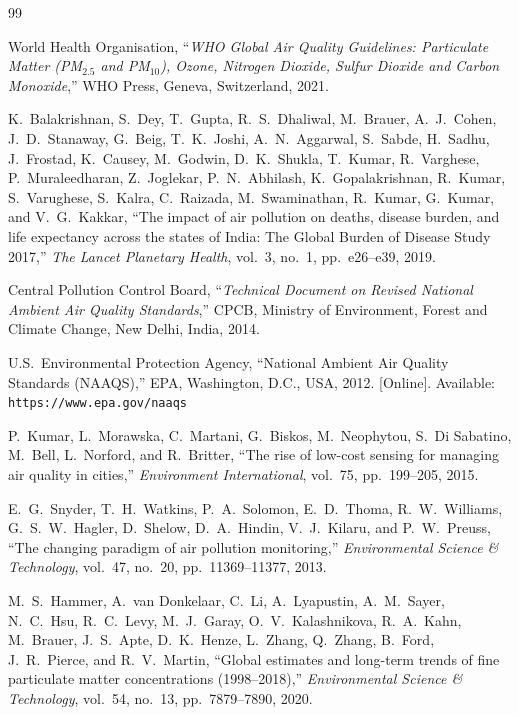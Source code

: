 \documentclass[conference]{IEEEtran}
\begin{document}
\begin{thebibliography}{99}

World Health Organisation,
``\emph{WHO Global Air Quality Guidelines: Particulate Matter (PM$_{2.5}$
and PM$_{10}$), Ozone, Nitrogen Dioxide, Sulfur Dioxide and Carbon
Monoxide},''
WHO Press, Geneva, Switzerland, 2021.

K.~Balakrishnan, S.~Dey, T.~Gupta, R.~S.~Dhaliwal, M.~Brauer,
A.~J.~Cohen, J.~D.~Stanaway, G.~Beig, T.~K.~Joshi, A.~N.~Aggarwal,
S.~Sabde, H.~Sadhu, J.~Frostad, K.~Causey, M.~Godwin, D.~K.~Shukla,
T.~Kumar, R.~Varghese, P.~Muraleedharan, Z.~Joglekar, P.~N.~Abhilash,
K.~Gopalakrishnan, R.~Kumar, S.~Varughese, S.~Kalra, C.~Raizada,
M.~Swaminathan, R.~Kumar, G.~Kumar, and V.~G.~Kakkar,
``The impact of air pollution on deaths, disease burden, and life expectancy
across the states of India: The Global Burden of Disease Study 2017,''
\emph{The Lancet Planetary Health}, vol.~3, no.~1, pp.~e26--e39, 2019.

Central Pollution Control Board,
``\emph{Technical Document on Revised National Ambient Air Quality
Standards},''
CPCB, Ministry of Environment, Forest and Climate Change,
New Delhi, India, 2014.

U.S.~Environmental Protection Agency,
``National Ambient Air Quality Standards (NAAQS),''
EPA, Washington, D.C., USA, 2012.
[Online]. Available: \texttt{https://www.epa.gov/naaqs}

P.~Kumar, L.~Morawska, C.~Martani, G.~Biskos, M.~Neophytou,
S.~Di Sabatino, M.~Bell, L.~Norford, and R.~Britter,
``The rise of low-cost sensing for managing air quality in cities,''
\emph{Environment International}, vol.~75, pp.~199--205, 2015.

E.~G.~Snyder, T.~H.~Watkins, P.~A.~Solomon, E.~D.~Thoma,
R.~W.~Williams, G.~S.~W.~Hagler, D.~Shelow, D.~A.~Hindin,
V.~J.~Kilaru, and P.~W.~Preuss,
``The changing paradigm of air pollution monitoring,''
\emph{Environmental Science \& Technology}, vol.~47, no.~20,
pp.~11369--11377, 2013.

M.~S.~Hammer, A.~van Donkelaar, C.~Li, A.~Lyapustin, A.~M.~Sayer,
N.~C.~Hsu, R.~C.~Levy, M.~J.~Garay, O.~V.~Kalashnikova, R.~A.~Kahn,
M.~Brauer, J.~S.~Apte, D.~K.~Henze, L.~Zhang, Q.~Zhang, B.~Ford,
J.~R.~Pierce, and R.~V.~Martin,
``Global estimates and long-term trends of fine particulate matter
concentrations (1998--2018),''
\emph{Environmental Science \& Technology}, vol.~54, no.~13,
pp.~7879--7890, 2020.


\end{thebibliography}
\end{document}
